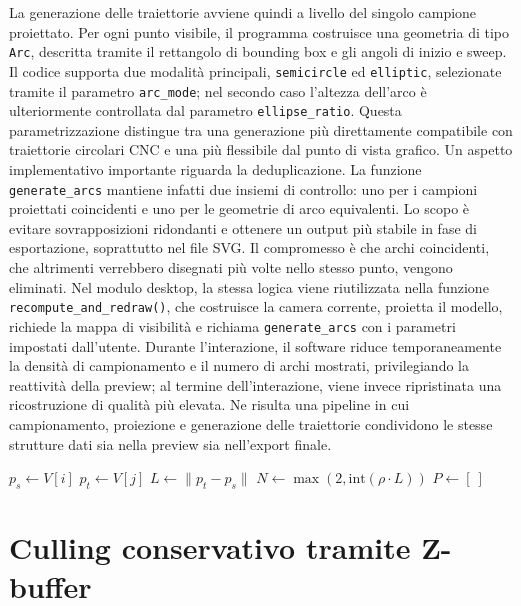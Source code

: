 \documentclass[a4paper,11pt,titlepage,twoside]{book}
\newcommand{\1}{\mathbf{1}}
\numberwithin{equation}{chapter}
\theoremstyle{plain}
\theoremstyle{definition}
\begin{document}
	La generazione delle traiettorie avviene quindi a livello del singolo campione proiettato. Per ogni punto visibile, il programma costruisce una geometria di tipo \texttt{Arc}, descritta tramite il rettangolo di bounding box e gli angoli di inizio e sweep. Il codice supporta due modalità principali, \texttt{semicircle} ed \texttt{elliptic}, selezionate tramite il parametro \texttt{arc\_mode}; nel secondo caso l’altezza dell’arco è ulteriormente controllata dal parametro \texttt{ellipse\_ratio}. Questa parametrizzazione distingue tra una generazione più direttamente compatibile con traiettorie circolari CNC e una più flessibile dal punto di vista grafico.
	Un aspetto implementativo importante riguarda la deduplicazione. La funzione \texttt{generate\_arcs} mantiene infatti due insiemi di controllo: uno per i campioni proiettati coincidenti e uno per le geometrie di arco equivalenti. Lo scopo è evitare sovrapposizioni ridondanti e ottenere un output più stabile in fase di esportazione, soprattutto nel file SVG. Il compromesso è che archi coincidenti, che altrimenti verrebbero disegnati più volte nello stesso punto, vengono eliminati.
	Nel modulo desktop, la stessa logica viene riutilizzata nella funzione \texttt{recompute\_and\_redraw()}, che costruisce la camera corrente, proietta il modello, richiede la mappa di visibilità e richiama \texttt{generate\_arcs} con i parametri impostati dall’utente. Durante l’interazione, il software riduce temporaneamente la densità di campionamento e il numero di archi mostrati, privilegiando la reattività della preview; al termine dell’interazione, viene invece ripristinata una ricostruzione di qualità più elevata. Ne risulta una pipeline in cui campionamento, proiezione e generazione delle traiettorie condividono le stesse strutture dati sia nella preview sia nell’export finale.

	\begin{algorithm}[htbp]
		\caption{Campionamento uniforme di uno spigolo}
		\label{alg:edge-sampling}
		$p_s \leftarrow V[i]$\;
		$p_t \leftarrow V[j]$\;
		$L \leftarrow \|p_t - p_s\|$\;
		$N \leftarrow \max(2, \mathrm{int}(\rho \cdot L))$\;
		$P \leftarrow [\ ]$\;
		\;
	\end{algorithm}
	
	\section{Culling conservativo tramite Z-buffer}
	
\end{document}
